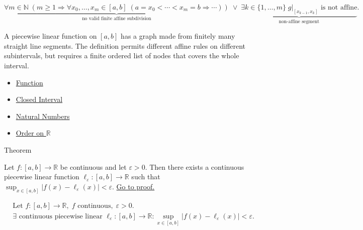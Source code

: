 \begin{remark*}
\[
\underbrace{\forall m\in\mathbb{N}\;(m\ge 1\Rightarrow
\forall x_0,\ldots,x_m\in[a,b]\;(a=x_0<\cdots<x_m=b\Rightarrow\cdots))}_{\text{no valid finite affine subdivision}}
\;\lor\;
\underbrace{\exists k\in\{1,\ldots,m\}\; g|_{[x_{k-1},x_k]}\text{ is not affine}}_{\text{non-affine segment}}.
\]
\end{remark*}

\begin{remark*}[Interpretation]
A piecewise linear function on $[a,b]$ has a graph made from finitely
many straight line segments. The definition permits different affine
rules on different subintervals, but requires a finite ordered list of
nodes that covers the whole interval.
\end{remark*}

\begin{dependencies}
\begin{itemize}
  \item \hyperref[def:function]{Function}
  \item \hyperref[def:closed-interval]{Closed Interval}
  \item \hyperref[def:natural-numbers]{Natural Numbers}
  \item \hyperref[def:order-on-r]{Order on $\mathbb{R}$}
\end{itemize}
\end{dependencies}

\begin{theorembox}{Theorem}
\begin{theorem}
\label{thm:piecewise-linear-approximation}
Let $f\colon[a,b]\to\mathbb{R}$ be continuous and let $\varepsilon>0$. Then there exists a continuous piecewise linear function $\ell_\varepsilon\colon[a,b]\to\mathbb{R}$ such that $\sup_{x\in[a,b]}|f(x)-\ell_\varepsilon(x)|<\varepsilon$. \hyperref[prf:piecewise-linear-approximation]{Go to proof.}
\end{theorem}
\end{theorembox}

\begin{remark*}
\[
\begin{aligned}
&\text{Let } f\colon[a,b]\to\mathbb{R},\; f \text{ continuous},\; \varepsilon>0.\\
&\exists\text{ continuous piecewise linear }\ell_\varepsilon\colon[a,b]\to\mathbb{R}:
\sup_{x\in[a,b]}|f(x)-\ell_\varepsilon(x)|<\varepsilon.
\end{aligned}
\]
\end{remark*}

